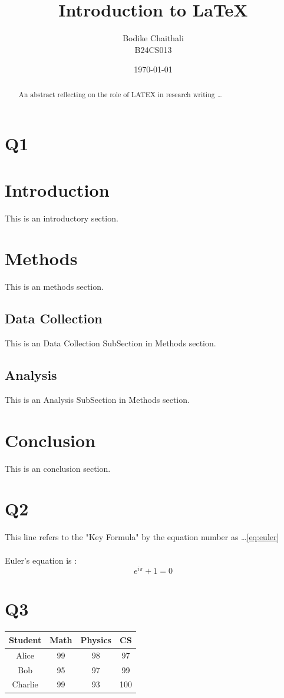 \documentclass{article}
\title{Introduction to LaTeX}
\author{Bodike Chaithali \\ B24CS013}
\date{\today}
\begin{document}
	\maketitle
	\section*{Q1}
	\begin{abstract}
		An abstract reflecting on the role of LATEX in research writing \dots
	\end{abstract}
	\section{Introduction}
	This is an introductory section.
	\section{Methods}
	This is an methods section.
	\subsection{Data Collection}
	This is an Data Collection SubSection in Methods section.
	\subsection{Analysis}
	This is an Analysis SubSection in Methods section.
	\section{Conclusion}
	This is an conclusion section.
	\section*{Q2}
	This line refers to the "Key Formula" by the equation number as \dots \ref{eq:euler}\\
	\\
	Euler's equation is :
	\begin{equation}
		e^{i\pi} + 1 =0
		\label{eq:euler}
	\end{equation} 
	\section*{Q3}
	\begin{table}[h]
		\centering
	\begin{tabular}{|c|c|c|c|}
		\hline
		Student & Math & Physics & CS \\
		\hline
		Alice & 99 & 98 & 97 \\
		\hline
		Bob & 95 & 97 & 99 \\
		\hline
		Charlie & 99 & 93 & 100 \\
		\hline
	\end{tabular}
\end{table}
\end{document}
